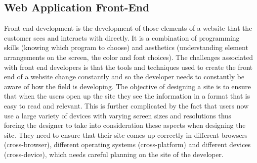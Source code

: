 \subsection{Web Application Front-End} 
Front end development is the development of those elements of a website that the customer sees and interacts with directly. It is a combination of programming skills (knowing which program to choose) and aesthetics (understanding element arrangements on the screen, the color and font choices). The challenges associated with front end developers is that the tools and techniques used to create the front end of a website change constantly and so the developer needs to constantly be aware of how the field is developing.
The objective of designing a site is to ensure that when the users open up the site they see the information in a format that is easy to read and relevant. This is further complicated by the fact that users now use a large variety of devices with varying screen sizes and resolutions thus forcing the designer to take into consideration these aspects when designing the site. They need to ensure that their site comes up correctly in different browsers (cross-browser), different operating systems (cross-platform) and different devices (cross-device), which needs careful planning on the site of the developer.
